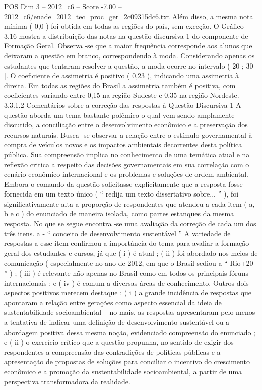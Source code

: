 \begin{textsample}{POS Dim 3 – 2012\_c6 – Score -7.00 – 2012\_c6/enade\_2012\_tec\_proc\_ger\_2c09315dc6.txt}
Além disso, a mesma nota mínima ( 0,0 ) foi obtida em todas as regiões do país, sem exceção.
O Gráfico 3.16 mostra a distribuição das notas na questão discursiva 1 do componente de Formação Geral.
Observa -se que a maior frequência corresponde aos alunos que deixaram a questão em branco, correspondendo à moda.
Considerando apenas os estudantes que tentaram resolver a questão, a moda ocorre no intervalo ( 20 ; 30 ].
O coeficiente de assimetria é positivo ( 0,23 ), indicando uma assimetria à direita.
Em todas as regiões do Brasil a assimetria também é positiva, com coeficientes variando entre 0,15 na região Sudeste e 0,35 na região Nordeste. 3.3.1.2 Comentários sobre a correção das respostas à Questão Discursiva 1 A questão aborda um tema bastante polêmico o qual vem sendo amplamente discutido, a conciliação entre o desenvolvimento econômico e a preservação dos recursos naturais.
Busca -se observar a relação entre o estímulo governamental à compra de veículos novos e os impactos ambientais decorrentes desta política pública.
Sua compreensão implica no conhecimento de uma temática atual e na reflexão critica a respeito das decisões governamentais em sua correlação com o cenário econômico internacional e os problemas e soluções de ordem ambiental.
Embora o comando da questão solicitasse explicitamente que a resposta fosse fornecida em um texto único ( “ redija um texto dissertativo sobre... ” ), foi significativamente alta a proporção de respondentes que atendeu a cada item ( a, b e c ) do enunciado de maneira isolada, como partes estanques da mesma resposta.
No que se segue encontra -se uma avaliação da correção de cada um dos três itens. a - “ conceito de desenvolvimento sustentável ” A variedade de respostas a esse item confirmou a importância do tema para avaliar a formação geral dos estudantes e cursos, já que ( i ) é atual ; ( ii ) foi abordado nos meios de comunicação ( especialmente no ano de 2012, em que o Brasil sediou a “ Rio+20 ” ) ; ( iii ) é relevante não apenas no Brasil como em todos os principais fóruns internacionais ; e ( iv ) é comum a diversas áreas de conhecimento.
Outros dois aspectos positivos merecem destaque : ( i ) a grande incidência de respostas que apontaram a relação entre gerações como aspecto essencial da ideia de sustentabilidade socioambiental – no mais, as respostas apresentaram pelo menos a tentativa de indicar uma definição de desenvolvimento sustentável ou a abordagem positiva dessa mesma noção, evidenciado compreensão do enunciado ; e ( ii ) o exercício crítico que a questão propunha, no sentido de exigir dos respondentes a compreensão das contradições de políticas públicas e a apresentação de propostas de soluções para conciliar o incentivo do crescimento econômico e a promoção da sustentabilidade socioambiental, a partir de uma perspectiva transformadora da realidade.

\end{textsample}
